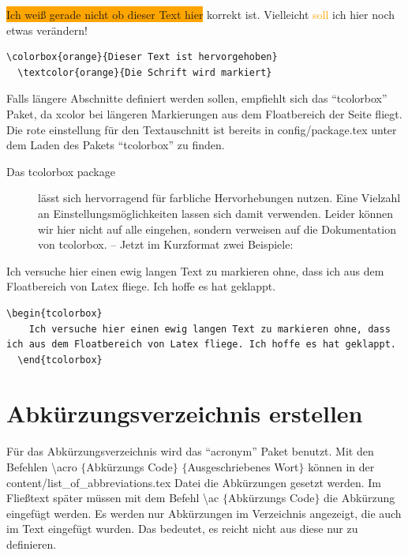 	\colorbox{orange}{Ich weiß gerade nicht ob dieser Text hier} korrekt ist. Vielleicht \textcolor{orange}{soll} ich hier noch etwas verändern!
\begin{lstlisting}[style=texlisting, caption={xcolor Definition}, label={lst:xcolorbeispiel}]
  \colorbox{orange}{Dieser Text ist hervorgehoben}
  \textcolor{orange}{Die Schrift wird markiert}
\end{lstlisting}

	Falls längere Abschnitte definiert werden sollen, empfiehlt sich das \enquote{tcolorbox} Paket, da xcolor bei 
	längeren Markierungen aus dem Floatbereich der Seite fliegt. Die rote einstellung für den Textauschnitt ist bereits in 
	config/package.tex unter dem Laden des Pakets \enquote{tcolorbox} zu finden.
	\begin{description}
		\item[Das tcolorbox package] lässt sich hervorragend für farbliche Hervorhebungen nutzen. 
		Eine Vielzahl an Einstellungsmöglichkeiten lassen sich damit verwenden. Leider können wir 
		hier nicht auf alle eingehen, sondern verweisen auf die Dokumentation von tcolorbox. -- Jetzt im Kurzformat zwei Beispiele:
	\end{description}
	
	\begin{tcolorbox}	
	Ich versuche hier einen ewig langen Text zu markieren ohne, dass ich aus dem Floatbereich von Latex fliege. Ich hoffe es hat geklappt.
	\end{tcolorbox}
\begin{lstlisting}[style=texlisting, caption={tcolorbox Definition}, label={lst:tcolorboxbeispiel}]
  \begin{tcolorbox}	
	Ich versuche hier einen ewig langen Text zu markieren ohne, dass ich aus dem Floatbereich von Latex fliege. Ich hoffe es hat geklappt.
  \end{tcolorbox}
\end{lstlisting}
	\newpage

	\section{Abkürzungsverzeichnis erstellen}
		\label{sec:abkuerzungsverzeichnis}
		Für das Abkürzungsverzeichnis wird das \enquote{acronym} Paket benutzt. Mit den Befehlen \textbackslash acro $\{$Abkürzungs Code$\}$ $\{$Ausgeschriebenes Wort$\}$ können in der content/list\_of\_abbreviations.tex Datei die Abkürzungen gesetzt werden. Im Fließtext später müssen mit dem Befehl \textbackslash ac $\{$Abkürzungs Code$\}$ die Abkürzung eingefügt werden. Es werden nur Abkürzungen im Verzeichnis angezeigt, die auch im Text eingefügt wurden. Das bedeutet, es reicht nicht aus diese nur zu definieren.
		
